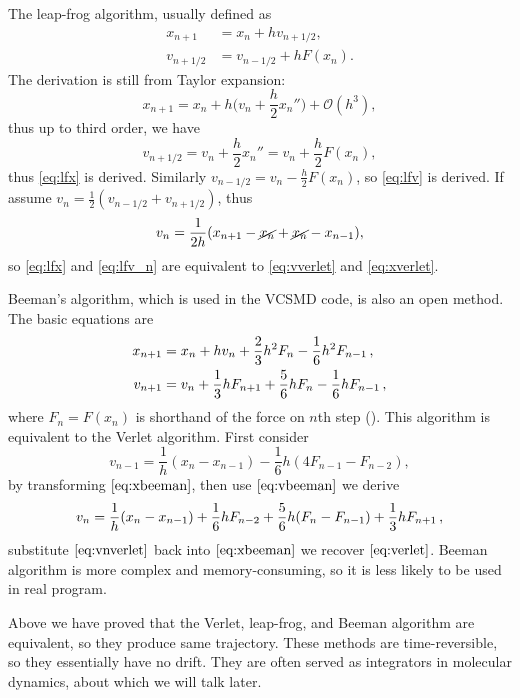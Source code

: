 The leap-frog algorithm, usually defined as
\begin{align}
x_{n+1} &= x_n + h v_{n+1/2}, \label{eq:lfx}\\
v_{n+1/2} &= v_{n-1/2} + h F(x_n).\label{eq:lfv}
\end{align}
The derivation is still from Taylor expansion:
\begin{equation}
  x_{n+1} = x_{n} + h \bigg(v_n + \frac{ h }{ 2 } x_n'' \bigg) + \mathcal{O}(h^3),
\end{equation}
thus up to third order, we have
\begin{equation}
v_{n + 1/2} = v_n + \frac{ h }{ 2 } x_n'' = v_n + \frac{ h }{ 2 } F(x_n),
\end{equation}
thus \eqref{eq:lfx} is derived.
Similarly $v_{n-1/2} = v_n - \frac{ h }{ 2 } F(x_n)$, so \eqref{eq:lfv} is derived.
If assume $v_n = \frac{ 1 }{ 2 }(v_{n-1/2} + v_{n+1/2})$, thus
\begin{equation}\label{eq:lfv_n}
v_n = \frac{ 1 }{ 2h }(x_{n+1} - \cancel{x_n} + \cancel{x_n} - x_{n-1}),
\end{equation}
so \eqref{eq:lfx} and \eqref{eq:lfv_n} are equivalent to \eqref{eq:vverlet} and \eqref{eq:xverlet}.

Beeman's algorithm, which is used in the VCSMD code, is also an open method.
The basic equations are
	\begin{align}
		x_{n+1} & = x_n + h v_n + \frac{ 2 }{ 3 } h^2 F_n - \frac{ 1 }{ 6 } h^2 F_{n-1} \thinspace,
		\label{eq:xbeeman}\\
		v_{n+1} & = v_n + \frac{ 1 }{ 3 }h F_{n+1} + \frac{ 5 }{ 6 } h F_n - \frac{ 1 }{ 6 } h F_{n-1}
		\thinspace,
		\label{eq:vbeeman}
	\end{align}
where $F_n = F(x_n)$ is shorthand of the force on $n$th step (\cite{dufty1986molecular}). This algorithm
is equivalent to the Verlet algorithm. First consider
\begin{equation}
	v_{n-1} = \frac{ 1 }{ h }(x_n - x_{n-1}) - \frac{ 1 }{ 6 } h (4 F_{n-1} - F_{n-2}),
\end{equation}
by transforming $\eqref{eq:xbeeman}$, then use $\eqref{eq:vbeeman}$ we derive
\begin{equation}\label{eq:vnverlet}
	v_n = \frac{ 1 }{ h }(x_n - x_{n-1}) + \frac{ 1 }{ 6 } h F_{n-2} + \frac{ 5 }{ 6 } h (F_n - F_{n-1})
	+ \frac{ 1 }{ 3 }h F_{n+1} \thinspace,
\end{equation}
substitute $\eqref{eq:vnverlet}$ back into $\eqref{eq:xbeeman}$ we recover $\eqref{eq:verlet}$.
Beeman algorithm is more complex and memory-consuming, so it is less likely to be used in
real program.

Above we have proved that the Verlet, leap-frog, and Beeman algorithm are equivalent,
so they produce same trajectory.
These methods are time-reversible, so they essentially have no drift. They are often
served as integrators in molecular dynamics, about which we will talk later.